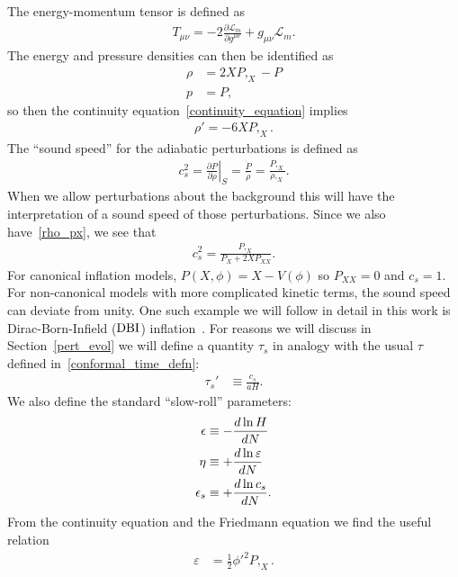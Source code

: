 The energy-momentum tensor is defined as
\begin{align}\label{gr_energy}
    T_{\mu\nu} = -2\frac{\partial\mathcal{L}_m}{\partial g^{\mu\nu}}+g_{\mu\nu}\mathcal{L}_m.
\end{align}
The energy and pressure densities can then be identified as
\begin{align}\label{rho_px}
    \rho &= 2XP,_X-P\\
    p &= P,
\end{align}
so then the continuity equation~\eqref{continuity_equation} implies
\begin{align}\label{rho_deriv}
    \rho' = -6XP,_X.
\end{align}
    The ``sound speed'' for the adiabatic perturbations is defined as~\cite{Christopherson_2009}
    \begin{align}\label{sound_speed_definition}
        c_s^2 = \left. \frac{\partial P}{\partial \rho} \right|_S = \frac{\dot{P}}{\dot{\rho}}
        = \frac{P,_X}{\rho,_X}.
    \end{align}
    When we allow perturbations about the background this will have the interpretation
    of a sound speed of those perturbations.
    Since we also have~\eqref{rho_px}, we see that
    \begin{align}
        c_s^2 = \frac{P,_X}{P_X+2X P_{XX}}.
    \end{align}
    For canonical inflation models, $P(X,\phi)=X-V(\phi)$
    so $P_{XX}=0$ and $c_s=1$.
    For non-canonical models with more complicated kinetic terms,
    the sound speed can deviate from unity.
    One such example we will follow in detail in this work is
    Dirac-Born-Infield ($\text{DBI}$) inflation~\cite{dbi_in_the_sky}.
    For reasons we will discuss in Section~\ref{pert_evol} we will
    define a quantity $\tau_s$
    in analogy with the usual $\tau$ defined in~\eqref{conformal_time_defn}:
    \begin{align}\label{tausdef}
        \tau_s'&\equiv\frac{c_s}{aH}.
    \end{align}
We also define the standard ``slow-roll'' parameters:
\begin{align}\label{slowrollparams}
    \epsilon &\equiv -\frac{d\ln H}{dN}	\\
    \eta &\equiv +\frac{d\ln \varepsilon}{dN}\\
    \epsilon_s &\equiv +\frac{d\ln c_s}{dN}.
\end{align}
From the continuity equation and the Friedmann equation
we find the useful relation
\begin{align}\label{epsilon_phi}
    \varepsilon &= \frac{1}{2}{\phi'}^2 P,_{X}.
\end{align}
